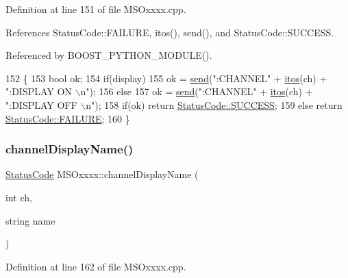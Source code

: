 Definition at line 151 of file M\+S\+Oxxxx.\+cpp.



References Status\+Code\+::\+F\+A\+I\+L\+U\+RE, itos(), send(), and Status\+Code\+::\+S\+U\+C\+C\+E\+SS.



Referenced by B\+O\+O\+S\+T\+\_\+\+P\+Y\+T\+H\+O\+N\+\_\+\+M\+O\+D\+U\+L\+E().


\begin{DoxyCode}
152 \{
153     \textcolor{keywordtype}{bool} ok;
154     \textcolor{keywordflow}{if}(display)     
155         ok = \hyperlink{classMSOxxxx_ae77668a1ae4ccb74e0ed5f2485dfdebf}{send}(\textcolor{stringliteral}{":CHANNEL"} + \hyperlink{Tools_8h_af330027dbdafb9a30768b3613c553e60}{itos}(ch) + \textcolor{stringliteral}{":DISPLAY ON \(\backslash\)n"});
156     \textcolor{keywordflow}{else}
157         ok = \hyperlink{classMSOxxxx_ae77668a1ae4ccb74e0ed5f2485dfdebf}{send}(\textcolor{stringliteral}{":CHANNEL"} + \hyperlink{Tools_8h_af330027dbdafb9a30768b3613c553e60}{itos}(ch) + \textcolor{stringliteral}{":DISPLAY OFF \(\backslash\)n"});
158     \textcolor{keywordflow}{if}(ok)  \textcolor{keywordflow}{return} \hyperlink{classStatusCode_a6f565cbeadc76d14c72f047e5e85eb4badd0da38d3ba0d922efd1f4619bc37ad8}{StatusCode::SUCCESS};
159     \textcolor{keywordflow}{else}        \textcolor{keywordflow}{return} \hyperlink{classStatusCode_a6f565cbeadc76d14c72f047e5e85eb4ba3da73d4c469762eb9d3c960368252b26}{StatusCode::FAILURE};  
160 \}
\end{DoxyCode}
\mbox{\label{classMSOxxxx_af9851b9ce16b0e88e8691c8174ba54f0}} 
\subsubsection{\texorpdfstring{channel\+Display\+Name()}{channelDisplayName()}}
{\footnotesize\ttfamily \hyperlink{classStatusCode}{Status\+Code} M\+S\+Oxxxx\+::channel\+Display\+Name (\begin{DoxyParamCaption}\item[{int}]{ch,  }\item[{string}]{name }\end{DoxyParamCaption})}



Definition at line 162 of file M\+S\+Oxxxx.\+cpp.




